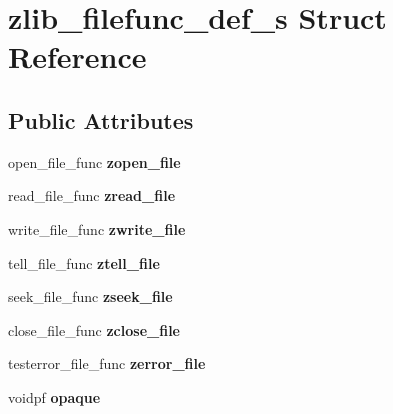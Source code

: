 \hypertarget{structzlib__filefunc__def__s}{\section{zlib\-\_\-filefunc\-\_\-def\-\_\-s Struct Reference}
\label{structzlib__filefunc__def__s}
}
\subsection*{Public Attributes}
\begin{DoxyCompactItemize}
\item 
\hypertarget{structzlib__filefunc__def__s_a49b78a559140e495b94af4d9dfe5c4e9}{open\-\_\-file\-\_\-func {\bfseries zopen\-\_\-file}}\label{structzlib__filefunc__def__s_a49b78a559140e495b94af4d9dfe5c4e9}

\item 
\hypertarget{structzlib__filefunc__def__s_ab14f748de7516525e5d2b78c47aca92e}{read\-\_\-file\-\_\-func {\bfseries zread\-\_\-file}}\label{structzlib__filefunc__def__s_ab14f748de7516525e5d2b78c47aca92e}

\item 
\hypertarget{structzlib__filefunc__def__s_a710b490fec793486ef5bedd9f2e1136d}{write\-\_\-file\-\_\-func {\bfseries zwrite\-\_\-file}}\label{structzlib__filefunc__def__s_a710b490fec793486ef5bedd9f2e1136d}

\item 
\hypertarget{structzlib__filefunc__def__s_ac8b933601443cdd83f8cc02004c77d0d}{tell\-\_\-file\-\_\-func {\bfseries ztell\-\_\-file}}\label{structzlib__filefunc__def__s_ac8b933601443cdd83f8cc02004c77d0d}

\item 
\hypertarget{structzlib__filefunc__def__s_a4747bdf97a3f44fe4b958114c11e1dcf}{seek\-\_\-file\-\_\-func {\bfseries zseek\-\_\-file}}\label{structzlib__filefunc__def__s_a4747bdf97a3f44fe4b958114c11e1dcf}

\item 
\hypertarget{structzlib__filefunc__def__s_ac46ac7ec0540dce117dab3f210d26763}{close\-\_\-file\-\_\-func {\bfseries zclose\-\_\-file}}\label{structzlib__filefunc__def__s_ac46ac7ec0540dce117dab3f210d26763}

\item 
\hypertarget{structzlib__filefunc__def__s_a61182b5b3ff83fb509b57ab4d2d9816d}{testerror\-\_\-file\-\_\-func {\bfseries zerror\-\_\-file}}\label{structzlib__filefunc__def__s_a61182b5b3ff83fb509b57ab4d2d9816d}

\item 
\hypertarget{structzlib__filefunc__def__s_a494b6d634b61bdc7fc7caed8e4fbe3f4}{voidpf {\bfseries opaque}}\label{structzlib__filefunc__def__s_a494b6d634b61bdc7fc7caed8e4fbe3f4}

\end{DoxyCompactItemize}


